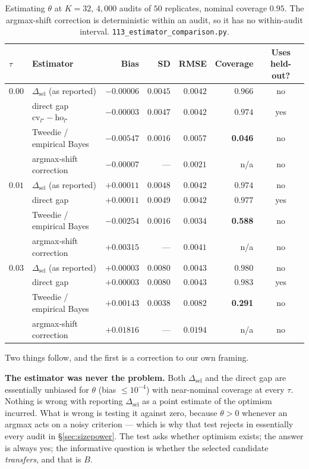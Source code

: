 \documentclass{article}
\begin{document}
\begin{table}[h]
\centering
\small
\begin{tabular}{@{}llrrrrc@{}}
\toprule
$\tau$ & Estimator & Bias & SD & RMSE & Coverage & Uses held-out? \\
\midrule
$0.00$ & $\Delta_{\text{sel}}$ (as reported) & $-0.00006$ & $0.0045$ & $0.0042$ & $0.966$ & no \\
       & direct gap $\text{cv}_{l^\star}-\text{ho}_{l^\star}$ & $-0.00003$ & $0.0047$ & $0.0042$ & $0.974$ & yes \\
       & Tweedie / empirical Bayes & $-0.00547$ & $0.0016$ & $0.0057$ & \textbf{0.046} & no \\
       & argmax-shift correction & $-0.00007$ & --- & $0.0021$ & n/a & no \\
\midrule
$0.01$ & $\Delta_{\text{sel}}$ (as reported) & $+0.00011$ & $0.0048$ & $0.0042$ & $0.974$ & no \\
       & direct gap & $+0.00011$ & $0.0049$ & $0.0042$ & $0.977$ & yes \\
       & Tweedie / empirical Bayes & $-0.00254$ & $0.0016$ & $0.0034$ & \textbf{0.588} & no \\
       & argmax-shift correction & $+0.00315$ & --- & $0.0041$ & n/a & no \\
\midrule
$0.03$ & $\Delta_{\text{sel}}$ (as reported) & $+0.00003$ & $0.0080$ & $0.0043$ & $0.980$ & no \\
       & direct gap & $+0.00003$ & $0.0080$ & $0.0043$ & $0.983$ & yes \\
       & Tweedie / empirical Bayes & $+0.00143$ & $0.0038$ & $0.0082$ & \textbf{0.291} & no \\
       & argmax-shift correction & $\mathbf{+0.01816}$ & --- & $0.0194$ & n/a & no \\
\bottomrule
\end{tabular}
\caption{Estimating $\theta$ at $K=32$, $4{,}000$ audits of $50$ replicates,
nominal coverage $0.95$. The argmax-shift correction is deterministic within
an audit, so it has no within-audit interval.
\texttt{113\_estimator\_comparison.py}.}
\label{tab:comparison}
\end{table}

Two things follow, and the first is a correction to our own framing.

\textbf{The estimator was never the problem.} Both
$\Delta_{\text{sel}}$ and the direct gap are essentially unbiased for $\theta$
(bias $\leq 10^{-4}$) with near-nominal coverage at every $\tau$. Nothing is
wrong with reporting $\Delta_{\text{sel}}$ as a point estimate of the optimism
incurred. What is wrong is testing it against zero, because
$\theta>0$ whenever an argmax acts on a noisy criterion --- which is why that
test rejects in essentially every audit in \S\ref{sec:sizepower}. The test
asks whether
optimism exists; the answer is always yes; the informative question is whether
the selected candidate \emph{transfers}, and that is $B$.
\end{document}
